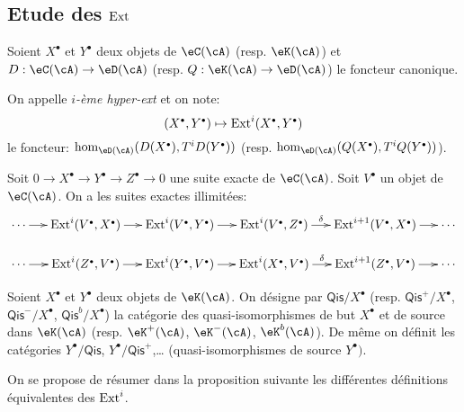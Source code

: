 \subsection{Etude des $\operatorname{Ext}$}\label{VIII:3-2}

Soient $X^\bullet$ et $Y^\bullet$ deux objets de $\eC(\cA)$ (resp. $\eK(\cA)$) 
et $D:\eC(\cA) \to \eD(\cA)$ (resp. $Q:\eK(\cA) \to \eD(\cA)$) le foncteur 
canonique. 





\begin{definition}\label{VIII:3-2-1}
On appelle \emph{$i$-ème hyper-ext} et on note: 
\[
  (X^\bullet,Y^\bullet)\mapsto \ext^i(X^\bullet,Y^\bullet) 
\]
le foncteur: $\hom_{\eD(\cA)}(D(X^\bullet),T^i D(Y^\bullet))$ (resp. 
$\hom_{\eD(\cA)}(Q(X^\bullet),T^i Q(Y^\bullet))$). 
\end{definition}





\begin{proposition}\label{VIII:3-2-2}
Soit $0 \to X^\bullet \to Y^\bullet \to Z^\bullet \to 0$ une suite exacte de 
$\eC(\cA)$. Soit $V^\bullet$ un objet de $\eC(\cA)$. On a les suites exactes 
illimitées: 
\[\xymatrix@=0.5cm{
  \cdots \ar[r] 
    & \ext^i(V^\bullet,X^\bullet) \ar[r] 
    & \ext^i(V^\bullet,Y^\bullet) \ar[r] 
    & \ext^i(V^\bullet,Z^\bullet) \ar[r]^-\delta 
    & \ext^{i+1}(V^\bullet,X^\bullet) \ar[r] 
    & \cdots \\
  \cdots \ar[r] 
    & \ext^i(Z^\bullet,V^\bullet) \ar[r] 
    & \ext^i(Y^\bullet,V^\bullet) \ar[r] 
    & \ext^i(X^\bullet,V^\bullet) \ar[r]^-\delta 
    & \ext^{i+1}(Z^\bullet,V^\bullet) \ar[r] 
    & \cdots
}\]
\end{proposition}

Soient $X^\bullet$ et $Y^\bullet$ deux objets de $\eK(\cA)$. On désigne par 
$\mathsf{Qis}/X^\bullet$ (resp. $\mathsf{Qis}^+/X^\bullet$, 
$\mathsf{Qis}^-/X^\bullet$, $\mathsf{Qis}^b/X^\bullet$) la catégorie des 
quasi-isomorphismes de but $X^\bullet$ et de source dans $\eK(\cA)$ (resp. 
$\eK^+(\cA)$, $\eK^-(\cA)$, $\eK^b(\cA)$). De même on définit les 
catégories $Y^\bullet/\mathsf{Qis}$, $Y^\bullet/\mathsf{Qis}^+$,\ldots 
(quasi-isomorphismes de source $Y^\bullet)$. 

On se propose de résumer dans la proposition suivante les différentes 
définitions équivalentes des $\operatorname{Ext}^i$. 





